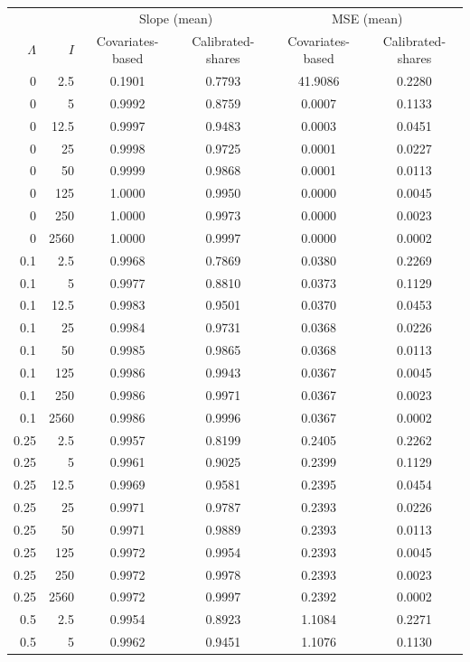 \begin{tabular}{rrcccc}
\toprule
& & \multicolumn{2}{c}{Slope (mean)} & \multicolumn{2}{c}{MSE (mean)} \\
 $\Lambda$ & $I$ & Covariates-based & Calibrated-shares & Covariates-based & Calibrated-shares\\
\midrule
 0 & 2.5 & 0.1901 & 0.7793 & 41.9086 & 0.2280\\
0 & 5 & 0.9992 & 0.8759 & 0.0007 & 0.1133\\
0 & 12.5 & 0.9997 & 0.9483 & 0.0003 & 0.0451\\
0 & 25 & 0.9998 & 0.9725 & 0.0001 & 0.0227\\
0 & 50 & 0.9999 & 0.9868 & 0.0001 & 0.0113\\
0 & 125 & 1.0000 & 0.9950 & 0.0000 & 0.0045\\
0 & 250 & 1.0000 & 0.9973 & 0.0000 & 0.0023\\
0 & 2560 & 1.0000 & 0.9997 & 0.0000 & 0.0002\\
\midrule
0.1 & 2.5 & 0.9968 & 0.7869 & 0.0380 & 0.2269\\
0.1 & 5 & 0.9977 & 0.8810 & 0.0373 & 0.1129\\
0.1 & 12.5 & 0.9983 & 0.9501 & 0.0370 & 0.0453\\
0.1 & 25 & 0.9984 & 0.9731 & 0.0368 & 0.0226\\
0.1 & 50 & 0.9985 & 0.9865 & 0.0368 & 0.0113\\
0.1 & 125 & 0.9986 & 0.9943 & 0.0367 & 0.0045\\
0.1 & 250 & 0.9986 & 0.9971 & 0.0367 & 0.0023\\
0.1 & 2560 & 0.9986 & 0.9996 & 0.0367 & 0.0002\\
\midrule
0.25 & 2.5 & 0.9957 & 0.8199 & 0.2405 & 0.2262\\
0.25 & 5 & 0.9961 & 0.9025 & 0.2399 & 0.1129\\
0.25 & 12.5 & 0.9969 & 0.9581 & 0.2395 & 0.0454\\
0.25 & 25 & 0.9971 & 0.9787 & 0.2393 & 0.0226\\
0.25 & 50 & 0.9971 & 0.9889 & 0.2393 & 0.0113\\
0.25 & 125 & 0.9972 & 0.9954 & 0.2393 & 0.0045\\
0.25 & 250 & 0.9972 & 0.9978 & 0.2393 & 0.0023\\
0.25 & 2560 & 0.9972 & 0.9997 & 0.2392 & 0.0002\\
\midrule
0.5 & 2.5 & 0.9954 & 0.8923 & 1.1084 & 0.2271\\
0.5 & 5 & 0.9962 & 0.9451 & 1.1076 & 0.1130\\

\end{tabular}
